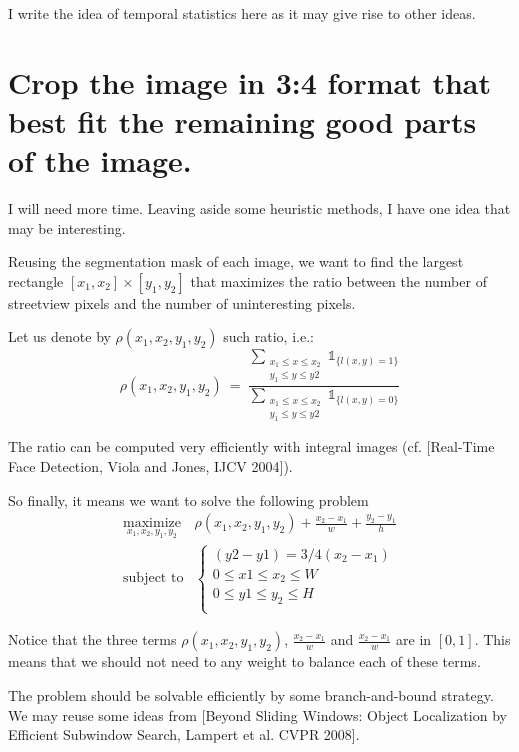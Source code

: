 \documentclass[a4paper,twoside,10pt]{article}
\begin{document}
I write the idea of temporal statistics here as it may give rise to other ideas.


\section{Crop the image in 3:4 format that best fit the remaining good parts of the image.}

I will need more time. Leaving aside some heuristic methods, I have one idea that may be interesting.

Reusing the segmentation mask of each image, we want to find the largest rectangle $[x_1, x_2] \times [y_1, y_2]$ that maximizes the ratio between the number of streetview pixels and the number of uninteresting pixels.

Let us denote by $\rho(x_1, x_2, y_1, y_2)$ such ratio, i.e.:
\begin{equation}
\rho(x_1, x_2, y_1, y_2) \ = \  
\frac{
  \displaystyle
  \sum_{\substack{x_1 \leq x \leq x_2\\y_1 \leq y \leq y2}} \mathds{1}_{\{l(x,y)=1\}}
}
{
  \displaystyle
  \sum_{\substack{x_1 \leq x \leq x_2\\y_1 \leq y \leq y2}} \mathds{1}_{\{l(x,y)=0\}}
}
\end{equation}

The ratio can be computed very efficiently with integral images (cf. [Real-Time Face Detection, Viola and Jones, IJCV 2004]).

So finally, it means we want to solve the following problem
\begin{equation}
\begin{array}{cc}
\underset{x_1, x_2, y_1, y_2}{\text{maximize}} & \rho(x_1, x_2, y_1, y_2) + 
\displaystyle \frac{x_2-x_1}{w} + \displaystyle \frac{y_2-y_1}{h} \\
\text{subject to} & 
  \left\{
  \begin{array}{c}
    (y2-y1) = 3/4 (x_2 - x_1) \\
    0 \leq x1 \leq x_2 \leq W \\
    0 \leq y1 \leq y_2 \leq H \\
  \end{array}
  \right.
\end{array}
\end{equation}

Notice that the three terms $\rho(x_1, x_2, y_1, y_2)$, $\frac{x_2-x_1}{w}$ and $\frac{x_2-x_1}{w}$ are in $[0, 1]$. This means that we should not need to any weight to balance each of these terms.

The problem should be solvable efficiently by some branch-and-bound strategy. We may reuse some ideas from [Beyond Sliding Windows: Object Localization by Efficient Subwindow Search, Lampert et al. CVPR 2008].
\end{document}
